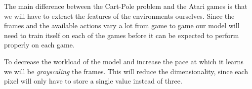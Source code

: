 \documentclass[11pt]{article}
\begin{document}
The main difference between the Cart-Pole problem and the Atari games is that
we will have to extract the features of the environments ourselves.
Since the frames and the available actions vary a lot from game to game
our model will need to train itself on each of the games before it can
be expected to perform properly on each game.

To decrease the workload of the model and increase the pace at which it learns
we will be \textit{grayscaling} the frames.
This will reduce the dimensionality, since each pixel will only have to
store a single value instead of three.
\end{document}
